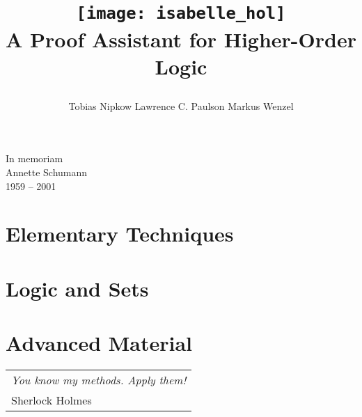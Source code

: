 \documentclass{article}
\begin{document}
\title{
\begin{center}
\texttt{[image: isabelle\_hol]}
       \\ \vspace{0.5cm} A Proof Assistant for Higher-Order Logic
\end{center}}
\author{Tobias Nipkow \quad Lawrence C. Paulson \quad Markus Wenzel%
}
\maketitle

\setcounter{page}{5}
\vspace*{\fill}
\begin{center}
\LARGE In memoriam \\[1ex]
{\sc Annette Schumann}\\[1ex]
1959 -- 2001
\end{center}
\vspace*{\fill}
\vspace*{\fill}
\newpage


\tableofcontents

\cleardoublepage{}

\part{Elementary Techniques}




\part{Logic and Sets}



\part{Advanced Material}




\markboth{}{}
\cleardoublepage
\vspace*{\fill}
\begin{flushright}
\begin{tabular}{l}
{\large\sf\slshape You know my methods. Apply them!}\\[1ex]
Sherlock Holmes
\end{tabular}
\end{flushright}
\vspace*{\fill}
\vspace*{\fill}





\printindex
\end{document}
